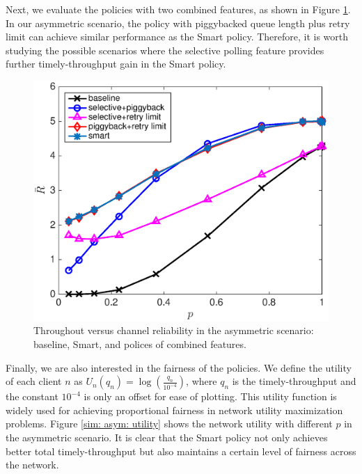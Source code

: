 \documentclass{article}
\begin{document}
Next, we evaluate the policies with two combined features, as shown in Figure \ref{sim: asym: combined}. In our asymmetric scenario, the policy with piggybacked queue length plus retry limit can achieve similar performance as the Smart policy. Therefore, it is worth studying the possible scenarios where the selective polling feature provides further timely-throughput gain in the Smart policy. 

\begin{figure}[htbp]
\centering
\includegraphics[scale=0.5]{asym_threecombinepolicys.eps}
\caption{Throughout versus channel reliability in the asymmetric scenario: baseline, Smart, and polices of combined features.}
\label{sim: asym: combined}
\end{figure}


Finally, we are also interested in the fairness of the policies. We define the utility of each client $n$ as $U_n(q_n)=\log \left(\frac{q_n}{10^{-4}}\right)$, where $q_n$ is the timely-throughput and the constant $10^{-4}$ is only an offset for ease of plotting. This utility function is widely used for achieving proportional fairness in network utility maximization problems. Figure \ref{sim: asym: utility} shows the network utility with different $p$ in the asymmetric scenario. It is clear that the Smart policy not only achieves better total timely-throughput but also maintains a certain level of fairness across the network. 
\end{document}
